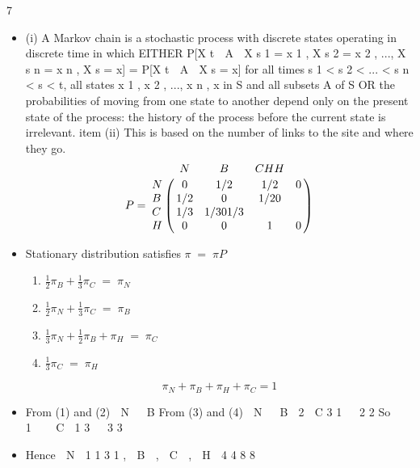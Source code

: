 \documentclass[a4paper,12pt]{article}
\begin{document}
7
\begin{itemize}
\item (i)
A Markov chain is a stochastic process with discrete states operating in
discrete time in which
EITHER
P[X t  A  X s 1 = x 1 , X s 2 = x 2 , ..., X s n = x n , X s = x] = P[X t  A  X s = x]
for all times s 1 < s 2 < ... < s n < s < t, all states x 1 , x 2 , ..., x n , x in S and all
subsets A of S
OR
the probabilities of moving from one state to another depend only on the
present state of the process: the history of the process before the current state
is irrelevant.
item (ii)
This is based on the number of links to the site and where they go.
\[P = \bordermatrix{

  & N & B & C H H \cr
N  & 0 & 1/2 & 1/2 & 0 \cr
B  & 1/2 & 0 &1/2 0 \cr
C  & 1/3 & 1/3 0 1/3 \cr
H  & 0 & 0 & 1 & 0 \cr
}\]

\item Stationary distribution satisfies $\pi \;=\; \pi P$

\begin{enumerate}
\item ${\displaystyle
\frac{1}{2} \pi_B + \frac{1}{3}\pi_C \;=\; \pi_N }$

\item ${\displaystyle
\frac{1}{2} \pi_N + \frac{1}{3}\pi_C \;=\; \pi_B }$

\item ${\displaystyle
\frac{1}{3} \pi_N + \frac{1}{2} \pi_B + \pi_H \;=\; \pi_C }$
\item ${\displaystyle
\frac{1}{3} \pi_C \;=\; \pi_H }$
\end{enumerate}

\[ \pi_N + \pi_B + \pi_H + \pi_C = 1\]


\item From (1) and (2)
 N   B
From (3) and (4)
 N   B 
2
 C
3
1 
 2 2
So    1    C  1
3 
 3 3


\item Hence
 N 
1
1
3
1
,  B  ,  C  ,  H 
4
4
8
8


\end{itemize}
\end{document}
